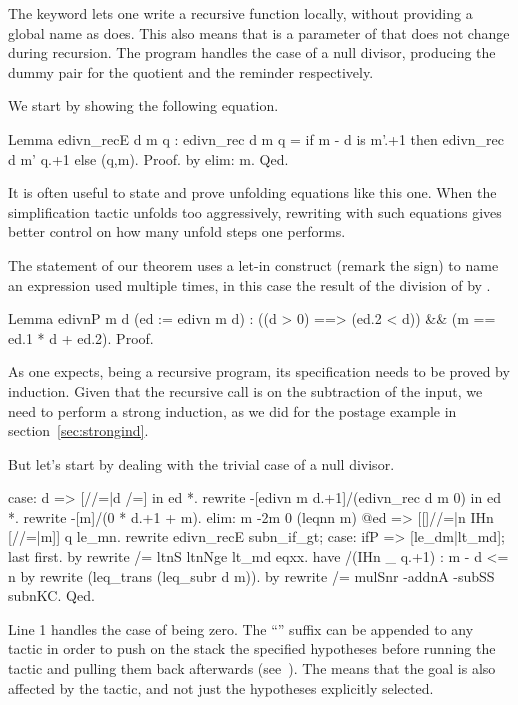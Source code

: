 The  keyword lets one write a recursive function locally, without
providing a global name as  does.  This also means that 
is a parameter of  that does not change during recursion.
The  program handles the case of a null divisor, producing
the dummy pair  for the quotient and the reminder respectively.

We start by showing the following equation.

\begin{coq}{}{}
Lemma edivn_recE d m q :
 edivn_rec d m q = if m - d is m'.+1 then edivn_rec d m' q.+1 else (q,m).
Proof. by elim: m. Qed.
\end{coq}
It is often useful to state and prove unfolding equations like this one.
When the simplification tactic \C{/=} unfolds too aggressively,
rewriting with such equations gives better control on how many
unfold steps one performs.

The statement of our theorem
uses a let-in construct (remark the \C{:=} sign)
to name an expression used multiple
times, in this case the result of the division of  by .

\begin{coq}{}{}
Lemma edivnP m d (ed := edivn m d) :
  ((d > 0) ==> (ed.2 < d)) && (m == ed.1 * d + ed.2).
Proof.
\end{coq}

As one expects,  being a recursive program, its specification
needs to be proved by induction.  Given that the recursive call is on
the subtraction of the input, we need to perform a strong induction,
as we did for the postage example in section~\ref{sec:strongind}.

But let's start by dealing with the trivial case of a null divisor.

\begin{coq}{}{}
case: d => [//=|d /=] in ed *.
rewrite -[edivn m d.+1]/(edivn_rec d m 0) in ed *.
rewrite -[m]/(0 * d.+1 + m).
elim: m {-2}m 0 (leqnn m) @ed => [[]//=|n IHn [//=|m]] q le_mn.
rewrite edivn_recE subn_if_gt; case: ifP => [le_dm|lt_md]; last first.
  by rewrite /= ltnS ltnNge lt_md eqxx.
have /(IHn _ q.+1) : m - d <= n by rewrite (leq_trans (leq_subr d m)).
by rewrite /= mulSnr -addnA -subSS subnKC.
Qed.
\end{coq}
Line 1 handles the case of  being zero.  The ``'' suffix
can be appended to any tactic in order to push on the stack the specified
hypotheses before running the tactic and pulling
them back afterwards (see~\cite[section 6.5]{ssrman}).
The \C{*} means that the goal is also affected by the tactic, and not just
the hypotheses explicitly selected.

